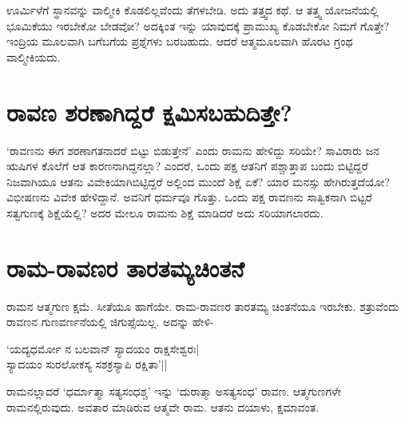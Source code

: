 ಊರ್ಮಿಳೆಗೆ ಸ್ಥಾನವನ್ನು ವಾಲ್ಮೀಕಿ ಕೊಡಲಿಲ್ಲವೆಂದು ತೆಗಳಬೇಡಿ. ಅದು ತತ್ತ್ವದ ಕಥೆ. ಆ ತತ್ತ್ವ ಯೋಜನೆಯಲ್ಲಿ ಭೂಮಿಕೆಯು ಇರಬೇಕೋ ಬೇಡವೋ? ಅದಕ್ಕಿಂತ ಇನ್ನು ಯಾವುದಕ್ಕೆ ಪ್ರಾಮುಖ್ಯ ಕೊಡಬೇಕೋ ನಿಮಗೆ ಗೊತ್ತೇ? ಇಂದ್ರಿಯ ಮೂಲವಾಗಿ ಬಗೆಬಗೆಯ ಪ್ರಶ್ನೆಗಳು ಬರಬಹುದು. ಆದರೆ ಆತ್ಮಮೂಲವಾಗಿ ಹೊರಟ ಗ್ರಂಥ ವಾಲ್ಮೀಕಿಯದು.

\section*{ರಾವಣ ಶರಣಾಗಿದ್ದರೆ ಕ್ಷಮಿಸಬಹುದಿತ್ತೇ?}

`ರಾವಣನು ಈಗ ಶರಣಾಗತನಾದರೆ ಬಿಟ್ಟು ಬಿಡುತ್ತೇನೆ' ಎಂದು ರಾಮನು ಹೇಳಿದ್ದು  ಸರಿಯೇ? ಸಾವಿರಾರು ಜನ ಋಷಿಗಳ ಕೊಲೆಗೆ ಆತ ಕಾರಣನಾಗಿದ್ದನಲ್ಲಾ? ಎಂದರೆ, ಒಂದು ಪಕ್ಷ ಆತನಿಗೆ ಪಶ್ಚಾತ್ತಾಪ ಬಂದು ಬಿಟ್ಟಿದ್ದರೆ ನಿಜವಾಗಿಯೂ ಆತನು ವಿವೇಕಿಯಾಗಿಬಿಟ್ಟಿದ್ದರೆ ಅಲ್ಲಿಂದ ಮುಂದೆ ಶಿಕ್ಷೆ ಏಕೆ? ಯಾರ ಮನಸ್ಸು ಹೇಗಿರುತ್ತದೆಯೋ? ವಿಭೀಷಣನು ವಿವೇಕ ಹೇಳಿದ್ದಾನೆ. ಅವನಿಗೆ ಧರ್ಮವೂ ಗೊತ್ತು. ಒಂದು ಪಕ್ಷ ರಾವಣನು ಸಾತ್ವಿಕನಾಗಿ ಬಿಟ್ಟರೆ ಸತ್ವಗುಣಕ್ಕೆ ಶಿಕ್ಷೆಯೆಲ್ಲಿ? ಅದರ ಮೇಲೂ ರಾಮನು ಶಿಕ್ಷೆ ಮಾಡಿದರೆ ಅದು ಸರಿಯಾಗಲಾರದು.

\section*{ರಾಮ-ರಾವಣರ ತಾರತಮ್ಯಚಿಂತನೆ}

ರಾಮನ ಆತ್ಮಗುಣ ಕ್ಷಮೆ. ಸೀತೆಯೂ ಹಾಗೆಯೇ. ರಾಮ-ರಾವಣರ ತಾರತಮ್ಯ ಚಿಂತನೆಯೂ ಇರಬೇಕು. ಶತ್ರುವೆಂದು ರಾವಣನ ಗುಣವರ್ಣನೆಯಲ್ಲಿ ಜಿಗುಪ್ಸೆಯಿಲ್ಲ. ಅದನ್ನು ಹೇಳಿ-

\begin{shloka}
`ಯದ್ಯಧರ್ಮೋ ನ ಬಲವಾನ್ ಸ್ಯಾದಯಂ ರಾಕ್ಷಸೇಶ್ವರಃ|\label{215}\\
ಸ್ಯಾದಯಂ ಸುರಲೋಕಸ್ಯ ಸಶಕ್ರಸ್ಯಾಪಿ ರಕ್ಷಿತಾ'||
\end{shloka}

ರಾಮನಲ್ಲಾದರೆ `ಧರ್ಮಾತ್ಮಾ ಸತ್ಯಸಂಧಶ್ಚ' ಇನ್ನು `ದುರಾತ್ಮಾ ಅಸತ್ಯಸಂಧ' ರಾವಣ. ಆತ್ಮಗುಣಗಳೇ ರಾಮನಲ್ಲಿರುವುದು. ಅವತಾರ ಮಾಡಿರುವ ಆತ್ಮವೇ ರಾಮ. ಆತನು ದಯಾಳು, ಕ್ಷಮಾವಂತ.
